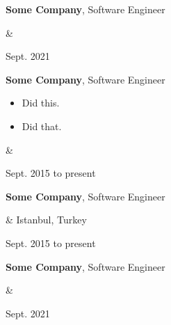 \documentclass[10pt, letterpaper]{article}
\newenvironment{highlights}{
        \begin{itemize}[
                topsep=0pt,
                parsep=0.10 cm,
                partopsep=0pt,
                itemsep=0pt,
                after=\relax,
                leftmargin=0.4 cm + 3pt
            ]
    }{
        \end{itemize}
    } %
\let\originalTabularx\tabularx
\let\originalEndTabularx\endtabularx
\renewenvironment{tabularx}{\bgroup\centering\originalTabularx}{\originalEndTabularx\par\egroup}
\begin{document}
        \vspace{0.2 cm}
        \begin{tabularx}{
            \textwidth-0.4 cm-0.13cm
        }{
            K{0.2 cm}
            R{4.1 cm}
        }
            \textbf{Some Company}, Software Engineer

            \vspace{0.10 cm}

            &
            

            Sept. 2021
        \end{tabularx}

        \vspace{0.2 cm}
        \begin{tabularx}{
            \textwidth-0.4 cm-0.13cm
        }{
            K{0.2 cm}
            R{4.1 cm}
        }
            \textbf{Some Company}, Software Engineer

            \vspace{0.10 cm}

            \begin{highlights}
                \item Did this.
                \item Did that.
            \end{highlights}
            &
            

            Sept. 2015 to present
        \end{tabularx}

        \vspace{0.2 cm}
        \begin{tabularx}{
            \textwidth-0.4 cm-0.13cm
        }{
            K{0.2 cm}
            R{4.1 cm}
        }
            \textbf{Some Company}, Software Engineer

            \vspace{0.10 cm}

            &
            Istanbul, Turkey

            Sept. 2015 to present
        \end{tabularx}

        \vspace{0.2 cm}
        \begin{tabularx}{
            \textwidth-0.4 cm-0.13cm
        }{
            K{0.2 cm}
            R{4.1 cm}
        }
            \textbf{Some Company}, Software Engineer

            \vspace{0.10 cm}

            &
            

            Sept. 2021
        \end{tabularx}
\end{document}
